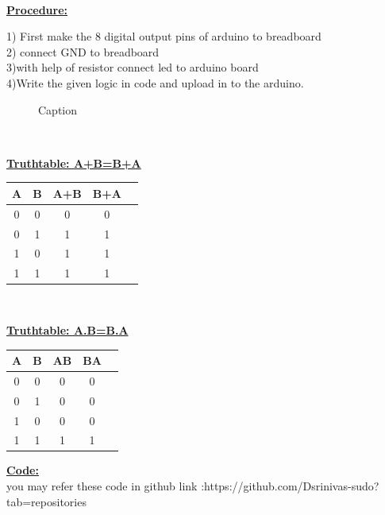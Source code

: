 \documentclass[letterpaper, 10 pt, conference]{ieeeconf}
\begin{document}
\vspace{5mm}
\\ \raggedright \textbf{\underline{Procedure:}}\vspace{2mm}
\\ \raggedright 1) First make the 8 digital output pins of arduino to breadboard 
\\ 2) connect GND to breadboard
\\ 3)with help of resistor connect led to arduino board
\\ 4)Write the given logic in code and upload in to the arduino.
 

\begin{figure}

    \centering
    

    \caption{Caption}
    \label{fig:my_label}
\end{figure}
\vspace{5mm}


\vspace{7mm}
\\ \raggedright \textbf{\underline{Truthtable: A+B=B+A}}\vspace{2mm}
\begin{table}[ht]
\centering %
\begin{tabular}{c c c c c} %
\hline\hline %
 \textbf{A} & \textbf{B} & \textbf{A+B} &\textbf{B+A}\\ [0.5ex] %
\hline
      0 & 0 & 0 & 0\\
      0 & 1 & 1 & 1\\
      1 & 0 & 1 & 1\\
      1 & 1 & 1 & 1\\
\hline
\end{tabular}
\end{table}
\\ \raggedright \textbf{\underline{Truthtable: A.B=B.A}}\vspace{2mm}
\begin{table}[ht]
\centering %
\begin{tabular}{c c c c c} %
\hline\hline %
  \textbf{A} & \textbf{B} & \textbf{AB} &\textbf{BA}\\ [0.5ex] %
\hline
      0 & 0 & 0 & 0\\
      0 & 1 & 0 & 0\\
      1 & 0 & 0 & 0\\
      1 & 1 & 1 & 1\\
\hline
\end{tabular}
\end{table}
\raggedright \textbf{\underline{Code:}}\vspace{7mm}
\\ you may  refer these code in github  \hspace{1mm}
link    :https://github.com/Dsrinivas-sudo?tab=repositories
\end{document}
